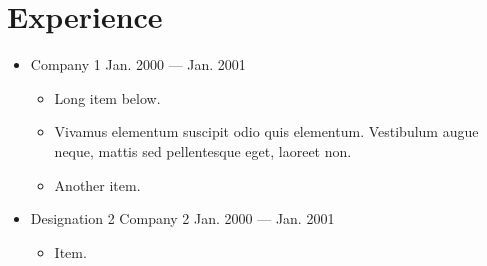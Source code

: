 \section{Experience}

\begin{itemize}
	\item {
			{Company 1}
			{Jan. 2000 --- Jan. 2001}

		\begin{itemize}
			\item Long item below.
			\item Vivamus elementum suscipit odio quis elementum. Vestibulum augue neque, mattis sed pellentesque eget, laoreet non.
			\item Another item.
		\end{itemize}
	}

	\item {
		\experience%
			{Designation 2}
			{Company 2}
			{Jan. 2000 --- Jan. 2001}

		\begin{itemize}
			\item Item.
		\end{itemize}
	}
\end{itemize}
